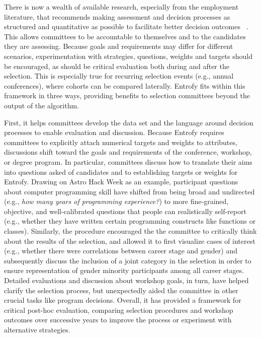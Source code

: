 \documentclass[12pt]{article}
\begin{document}
\begin{bf}
There is now a wealth of available research, especially from the employment literature, that recommends making assessment and decision processes as structured and quantitative as possible to facilitate better decision outcomes ~\cite{sunstein2015wiser}.
This allows committees to be accountable to themselves and to the candidates they are assessing.
Because goals and requirements may differ for different scenarios, experimentation with strategies, questions, weights and targets should be encouraged, as should be critical evaluation both during and after the selection.
This is especially true for recurring selection events (e.g., annual conferences), where cohorts can be compared laterally.
Entrofy fits within this framework in three ways, providing benefits to selection committees beyond the output of the algorithm.

First, it helps committees develop the data set and the language around decision processes to enable evaluation and discussion.
Because Entrofy requires committees to explicitly attach numerical targets and weights to attributes, discussions shift toward the goals and requirements of the conference, workshop, or degree program. In particular, committees discuss how to translate their aims into questions asked of candidates and to establishing targets or weights for Entrofy.
Drawing on Astro Hack Week as an example, participant questions about computer programming skill have shifted from being broad and undirected (e.g., \emph{how many years of programming experience?}) to more fine-grained, objective, and well-calibrated questions that people can realistically self-report (e.g., whether they have written certain programming constructs like functions or classes).
Similarly, the procedure encouraged the the committee to critically think about the results of the selection, and allowed it to first visualize cases of interest (e.g., whether there were correlations between career stage and gender) and subsequently discuss the inclusion of a joint category in the selection in order to ensure representation of gender minority participants among all career stages.
Detailed evaluations and discussion about workshop goals, in turn, have helped clarify the selection process, but unexpectedly aided the committee in other crucial tasks like program decisions. 
Overall, it has provided a framework for critical post-hoc evaluation, comparing selection procedures and workshop outcomes over successive years to improve the process or experiment with alternative strategies.


\end{bf}
\end{document}
